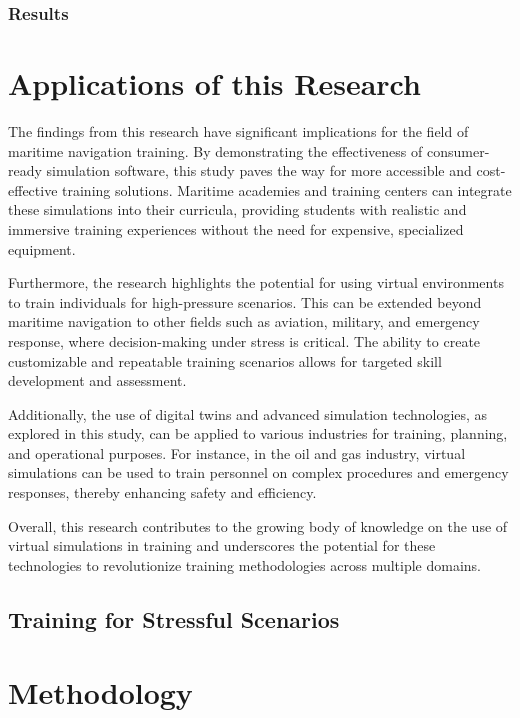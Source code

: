 \documentclass[12pt]{article}
\begin{document}
\subsubsection{Results}

\section{Applications of this Research}

The findings from this research have significant implications for the field of maritime navigation training. By demonstrating the effectiveness of consumer-ready simulation software, this study paves the way for more accessible and cost-effective training solutions. Maritime academies and training centers can integrate these simulations into their curricula, providing students with realistic and immersive training experiences without the need for expensive, specialized equipment.

Furthermore, the research highlights the potential for using virtual environments to train individuals for high-pressure scenarios. This can be extended beyond maritime navigation to other fields such as aviation, military, and emergency response, where decision-making under stress is critical. The ability to create customizable and repeatable training scenarios allows for targeted skill development and assessment.

Additionally, the use of digital twins and advanced simulation technologies, as explored in this study, can be applied to various industries for training, planning, and operational purposes. For instance, in the oil and gas industry, virtual simulations can be used to train personnel on complex procedures and emergency responses, thereby enhancing safety and efficiency.

Overall, this research contributes to the growing body of knowledge on the use of virtual simulations in training and underscores the potential for these technologies to revolutionize training methodologies across multiple domains. 

\subsection{Training for Stressful Scenarios}

\section{Methodology}
\end{document}
